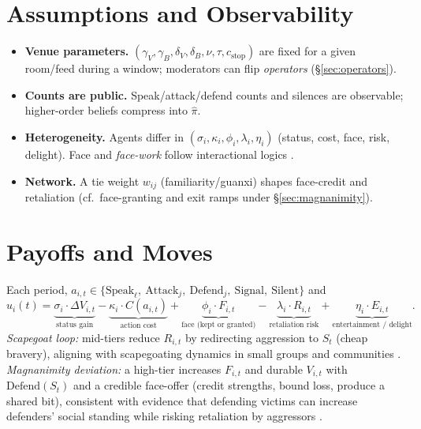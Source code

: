 \documentclass[11pt]{article}
\theoremstyle{definition}
\begin{document}
\section{Assumptions and Observability}
\begin{itemize}[leftmargin=2em]
\item \textbf{Venue parameters.} $(\gamma_V,\gamma_B,\delta_V,\delta_B,\nu,\tau,c_{\text{stop}})$ are fixed for a given room/feed during a window; moderators can flip \emph{operators} (\S\ref{sec:operators}).
\item \textbf{Counts are public.} Speak/attack/defend counts and silences are observable; higher\hyp order beliefs compress into $\hat\pi$.
\item \textbf{Heterogeneity.} Agents differ in $(\sigma_i,\kappa_i,\phi_i,\lambda_i,\eta_i)$ (status, cost, face, risk, delight). Face and \emph{face\hyp work} follow interactional logics \citep{goffman1955}.
\item \textbf{Network.} A tie weight $w_{ij}$ (familiarity/guanxi) shapes face\hyp credit and retaliation (cf.\ face\hyp granting and exit ramps under \S\ref{sec:magnanimity}).
\end{itemize}

\section{Payoffs and Moves}
Each period, $a_{i,t}\in\{\text{Speak}_\ell,\ \text{Attack}_j,\ \text{Defend}_j,\ \text{Signal},\ \text{Silent}\}$ and
\begin{equation}
u_i(t)= \underbrace{\sigma_i \cdot \Delta V_{i,t}}_{\text{status gain}}
-\underbrace{\kappa_i \cdot C(a_{i,t})}_{\text{action cost}}
+\underbrace{\phi_i \cdot F_{i,t}}_{\text{face (kept or granted)}}
-\underbrace{\lambda_i \cdot R_{i,t}}_{\text{retaliation risk}}
+\underbrace{\eta_i \cdot E_{i,t}}_{\text{entertainment / delight}}.
\end{equation}
\emph{Scapegoat loop:} mid\hyp tiers reduce $R_{i,t}$ by redirecting aggression to $S_t$ (cheap bravery), aligning with scapegoating dynamics in small groups and communities \citep{gemmill1989,girard1986}. \emph{Magnanimity deviation:} a high\hyp tier increases $F_{i,t}$ and durable $V_{i,t}$ with $\mathrm{Defend}(S_t)$ and a credible face\hyp offer (credit strengths, bound loss, produce a shared bit), consistent with evidence that defending victims can increase defenders' social standing while risking retaliation by aggressors \citep{salmivalli2010,huitsing2014}.
\end{document}
